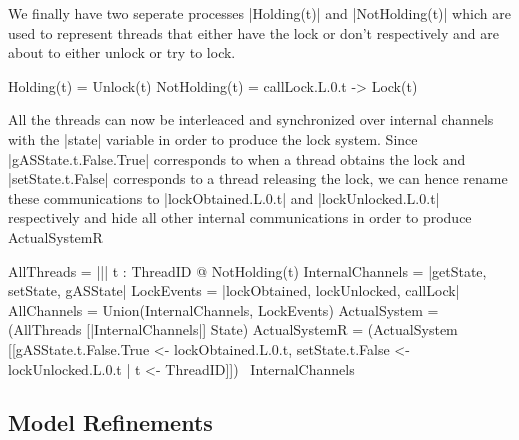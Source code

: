 We finally have two seperate processes |Holding(t)| and |NotHolding(t)| which are used to represent threads that either have the lock or don't respectively and are about to either unlock or try to lock.

\begin{cspm}
  Holding(t) = Unlock(t)
  NotHolding(t) = callLock.L.0.t -> Lock(t)
\end{cspm}

All the threads can now be interleaced and synchronized over internal channels with the |state| variable in order to produce the lock system. Since |gASState.t.False.True| corresponds to when a thread obtains the lock and |setState.t.False| corresponds to a thread releasing the lock, we can hence rename these communications to |lockObtained.L.0.t| and |lockUnlocked.L.0.t| respectively and hide all other internal communications in order to produce ActualSystemR

\begin{cspm}
  AllThreads = ||| t : ThreadID @ NotHolding(t)
  InternalChannels = {|getState, setState, gASState|}
  LockEvents = {|lockObtained, lockUnlocked, callLock|}
  AllChannels = Union({InternalChannels, LockEvents})
  ActualSystem = (AllThreads [|InternalChannels|] State)
  ActualSystemR = (ActualSystem [[gASState.t.False.True <- lockObtained.L.0.t, setState.t.False <- lockUnlocked.L.0.t | t <- ThreadID]]) \ InternalChannels
\end{cspm}

\subsection{Model Refinements}

